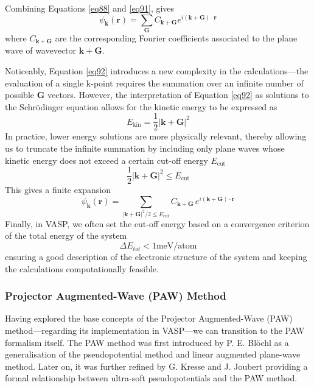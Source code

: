 \begin{itemize}
Combining Equations \ref{eq88} and \ref{eq91}, gives 
\begin{equation}
    \label{eq92}
    \psi_{\mathbf{k}}(\mathbf{r}) =
    \sum_{\mathbf{G}} C_{\mathbf{k+G}} e^{i(\mathbf{k} + \mathbf{G}) \cdot \mathbf{r}}
\end{equation}
where $C_{\mathbf{k+G}}$ are the corresponding Fourier coefficients 
associated to the plane wave of wavevector $\mathbf{k} + \mathbf{G}$.

Noticeably, Equation \ref{eq92} introduces a new complexity in the calculations---the evaluation of a single k-point requires the summation over an infinite number of possible $\mathbf{G}$ vectors. However, the interpretation of Equation \ref{eq92} as solutions to the Schrödinger equation allows for the kinetic energy to be expressed as
\begin{equation}
    \label{eq93}
    E_{\text{kin}} = \frac{1}{2} |\mathbf{k} + \mathbf{G}|^2
\end{equation}
In practice, lower energy solutions are more physically relevant, thereby allowing us to truncate the infinite summation by including only plane waves whose kinetic energy does not exceed a certain cut-off energy
$E_{\text{cut}}$
\begin{equation}
\label{eq94} 
\frac{1}{2} |\mathbf{k} + \mathbf{G}|^2 \leq E_{\text{cut}}
\end{equation}
This gives a finite expansion
\begin{equation}
    \label{eq95}
    \psi_{\mathbf{k}}(\mathbf{r}) = \sum_{|\mathbf{k} + \mathbf{G}|^2/2 \leq E_{\text{cut}}}
C_{\mathbf{k}+\mathbf{G}} \, e^{i(\mathbf{k} + \mathbf{G}) \cdot \mathbf{r}}
\end{equation}
Finally, in VASP, we often set the cut-off energy based on a convergence criterion of the total energy of the system 
\begin{equation}
\label{eq96}
    \Delta E_{tot} < 1 \text{meV/atom}
\end{equation}
ensuring a good description of the electronic structure of the system and keeping the calculations computationally feasible.

\end{itemize}

\subsubsection{Projector Augmented-Wave (PAW) Method}
Having explored the base concepts of the Projector Augmented-Wave (PAW) method---regarding its implementation in VASP---we can transition to the PAW formalism itself. The PAW method was first introduced by P. E. Bl\"ochl\supercite{Blochl1994} as a generalisation of the pseudopotential method and linear augmented plane-wave method. Later on, it was further refined by G. Kresse and J. Joubert\supercite{Kresse1999} providing a formal relationship between ultra-soft pseudopotentials and the PAW method. 

